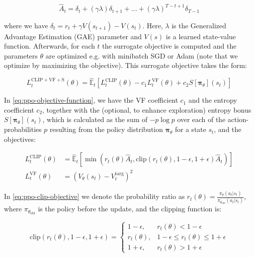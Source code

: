 \begin{equation}
  \hat{A}_{t} = \delta_{t} + \left(\gamma \lambda\right) \delta_{t+1} + ... + \left(\gamma \lambda\right)^{T-t+1} \delta_{T - 1}
  \label{eq:ppo-advantage-estimator}
\end{equation}

\noindent where we have $\delta_{t} = r_{t} + \gamma V(s_{t+1}) - V(s_{t})$. Here, $\lambda$ is the Generalized Advantage Estimation (GAE) parameter and $V(s)$ is a learned state-value function. Afterwards, for each $t$ the surrogate objective is computed and the parameters $\theta$ are optimized e.g. with minibatch SGD or Adam (note that we optimize by maximizing the objective). This surrogate objective takes the form:

\begin{equation}
  L_{t}^{\text{CLIP} + \text{VF} + \text{S}}(\theta) = \hat{\mathbb{E}}_{t} \left[L_{t}^{\text{CLIP}}(\theta) - c_{1} L_{t}^{\text{VF}}(\theta) + c_{2} S[\boldsymbol{\pi}_{\theta}](s_{t})\right]
  \label{eq:ppo-objective-function}
\end{equation}

\noindent In \eqref{eq:ppo-objective-function}, we have the VF coefficient $c_{1}$ and the entropy coefficient $c_{2}$, together with the (optional, to enhance exploration) entropy bonus $S[\boldsymbol{\pi}_{\theta}](s_{t})$, which is calculated as the sum of $- p \log{p}$ over each of the action-probabilities $p$ resulting from the policy distribution $\boldsymbol{\pi}_{\theta}$ for a state $s_{t}$, and the objectives:

\begin{align}
  \label{eq:ppo-clip-objective} L_{t}^{\text{CLIP}}(\theta) &= \hat{\mathbb{E}}_{t}\left[\min\left(r_{t}(\theta) \hat{A}_{t}, \text{clip}\left(r_{t}(\theta), 1 - \epsilon, 1 + \epsilon\right) \hat{A}_{t}\right)\right]\\
  \label{eq:ppo-vf-objective} L_{t}^{\text{VF}}(\theta) &= \left(V_{\theta}(s_{t}) - V_{t}^{\text{targ}}\right)^{2}
\end{align}

\noindent In \eqref{eq:ppo-clip-objective} we denote the probability ratio as $r_{t}(\theta) = \frac{\pi_{\theta}\left(a_{t}|s_{t}\right)}{\pi_{\theta_{\text{old}}}(a_{t}|s_{t})}$, where $\pi_{\theta_{\text{old}}}$ is the policy before the update, and the clipping function is:

\begin{equation}
  \text{clip}\left(r_{t}(\theta), 1 - \epsilon, 1 + \epsilon\right) = \begin{cases}
    1 - \epsilon, &r_{t}(\theta) < 1 - \epsilon\\
    r_{t}(\theta), &1 - \epsilon \leq r_{t}(\theta) \leq 1 + \epsilon\\
    1 + \epsilon, &r_{t}(\theta) > 1 + \epsilon
  \end{cases}
  \label{eq:clipping-function}
\end{equation}


